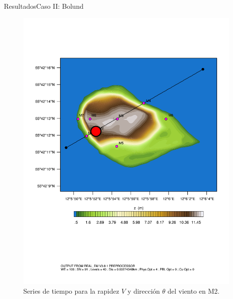 \documentclass[mathserif,10pt]{beamer}
\begin{document}
\begin{frame}{Resultados}{Caso II: Bolund}
\begin{figure}[H]
\begin{minipage}{0.35\linewidth}
			\includegraphics[width=1\linewidth,page=1,trim={3.5cm 9.3cm 0.8cm 3.8cm},clip]{fig/05/ppt/bol_control_point2.pdf}%
		\end{minipage}%
		\vspace{-2mm}\caption{Series de tiempo para la rapidez $V$ y dirección $\theta$ del viento en M2.}
		\label{fig:06_bol_ts_m2}
	\end{figure}
\end{frame}
\end{document}
